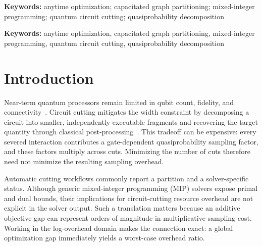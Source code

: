 \documentclass[11pt]{article}
\newenvironment{IEEEkeywords}{\par\noindent\textbf{Keywords: }}{\par}
\begin{document}
\ifdefined\quantumversion
\textbf{Keywords:} anytime optimization; capacitated graph partitioning; mixed-integer programming; quantum circuit cutting; quasiprobability decomposition
\else
\begin{IEEEkeywords}
anytime optimization, capacitated graph partitioning, mixed-integer programming, quantum circuit cutting, quasiprobability decomposition
\end{IEEEkeywords}
\fi

\section{Introduction}

Near-term quantum processors remain limited in qubit count, fidelity, and connectivity~\cite{preskill2018}. Circuit cutting mitigates the width constraint by decomposing a circuit into smaller, independently executable fragments and recovering the target quantity through classical post-processing~\cite{peng2020,bravyi2016,tang2021}. This tradeoff can be expensive: every severed interaction contributes a gate-dependent quasiprobability sampling factor, and these factors multiply across cuts. Minimizing the number of cuts therefore need not minimize the resulting sampling overhead.

Automatic cutting workflows commonly report a partition and a solver-specific status. Although generic mixed-integer programming (MIP) solvers expose primal and dual bounds, their implications for circuit-cutting resource overhead are not explicit in the solver output. Such a translation matters because an additive objective gap can represent orders of magnitude in multiplicative sampling cost. Working in the log-overhead domain makes the connection exact: a global optimization gap immediately yields a worst-case overhead ratio.
\end{document}
